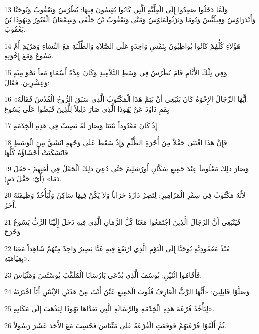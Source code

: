 \par 13 وَلَمَّا دَخَلُوا صَعِدُوا إِلَى الْعِلِّيَّةِ الَّتِي كَانُوا يُقِيمُونَ فِيهَا: بُطْرُسُ وَيَعْقُوبُ وَيُوحَنَّا وَأَنْدَرَاوُسُ وَفِيلُبُّسُ وَتُومَا وَبَرْثُولَمَاوُسُ وَمَتَّى وَيَعْقُوبُ بْنُ حَلْفَى وَسِمْعَانُ الْغَيُورُ وَيَهُوذَا بْنُ يَعْقُوبَ.
\par 14 هَؤُلاَءِ كُلُّهُمْ كَانُوا يُواظِبُونَ بِنَفْسٍ وَاحِدَةٍ عَلَى الصَّلاَةِ وَالطِّلْبَةِ مَعَ النِّسَاءِ وَمَرْيَمَ أُمِّ يَسُوعَ وَمَعَ إِخْوَتِهِ.
\par 15 وَفِي تِلْكَ الأَيَّامِ قَامَ بُطْرُسُ فِي وَسَطِ التَّلاَمِيذِ وَكَانَ عِدَّةُ أَسْمَاءٍ مَعاً نَحْوَ مِئَةٍ وَعِشْرِينَ. فَقَالَ:
\par 16 «أَيُّهَا الرِّجَالُ الإِخْوَةُ كَانَ يَنْبَغِي أَنْ يَتِمَّ هَذَا الْمَكْتُوبُ الَّذِي سَبَقَ الرُّوحُ الْقُدُسُ فَقَالَهُ بِفَمِ دَاوُدَ عَنْ يَهُوذَا الَّذِي صَارَ دَلِيلاً لِلَّذِينَ قَبَضُوا عَلَى يَسُوعَ
\par 17 إِذْ كَانَ مَعْدُوداً بَيْنَنَا وَصَارَ لَهُ نَصِيبٌ فِي هَذِهِ الْخِدْمَةِ.
\par 18 فَإِنَّ هَذَا اقْتَنَى حَقْلاً مِنْ أُجْرَةِ الظُّلْمِ وَإِذْ سَقَطَ عَلَى وَجْهِهِ انْشَقَّ مِنَ الْوَسَطِ فَانْسَكَبَتْ أَحْشَاؤُهُ كُلُّهَا.
\par 19 وَصَارَ ذَلِكَ مَعْلُوماً عِنْدَ جَمِيعِ سُكَّانِ أُورُشَلِيمَ حَتَّى دُعِيَ ذَلِكَ الْحَقْلُ فِي لُغَتِهِمْ «حَقْلَ دَمَا» (أَيْ: حَقْلَ دَمٍ).
\par 20 لأَنَّهُ مَكْتُوبٌ فِي سِفْرِ الْمَزَامِيرِ: لِتَصِرْ دَارُهُ خَرَاباً وَلاَ يَكُنْ فِيهَا سَاكِنٌ وَلْيَأْخُذْ وَظِيفَتَهُ آَخَرُ.
\par 21 فَيَنْبَغِي أَنَّ الرِّجَالَ الَّذِينَ اجْتَمَعُوا مَعَنَا كُلَّ الزَّمَانِ الَّذِي فِيهِ دَخَلَ إِلَيْنَا الرَّبُّ يَسُوعُ وَخَرَجَ
\par 22 مُنْذُ مَعْمُودِيَّةِ يُوحَنَّا إِلَى الْيَوْمِ الَّذِي ارْتَفَعَ فِيهِ عَنَّا يَصِيرُ وَاحِدٌ مِنْهُمْ شَاهِداً مَعَنَا بِقِيَامَتِهِ».
\par 23 فَأَقَامُوا اثْنَيْنِ: يُوسُفَ الَّذِي يُدْعَى بَارْسَابَا الْمُلَقَّبَ يُوسْتُسَ وَمَتِّيَاسَ.
\par 24 وَصَلَّوْا قَائِلِينَ: «أَيُّهَا الرَّبُّ الْعَارِفُ قُلُوبَ الْجَمِيعِ عَيِّنْ أَنْتَ مِنْ هَذَيْنِ الاِثْنَيْنِ أَيّاً اخْتَرْتَهُ
\par 25 لِيَأْخُذَ قُرْعَةَ هَذِهِ الْخِدْمَةِ وَالرِّسَالَةِ الَّتِي تَعَدَّاهَا يَهُوذَا لِيَذْهَبَ إِلَى مَكَانِهِ».
\par 26 ثُمَّ أَلْقَوْا قُرْعَتَهُمْ فَوَقَعَتِ الْقُرْعَةُ عَلَى مَتِّيَاسَ فَحُسِبَ مَعَ الأَحَدَ عَشَرَ رَسُولاً.

